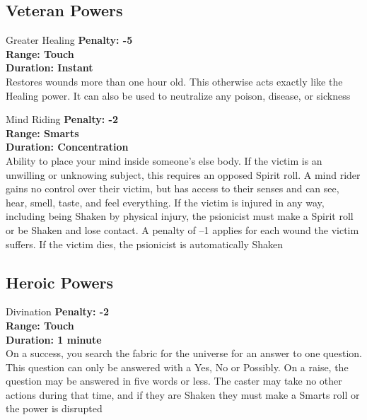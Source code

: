 \begin{multicols}{2}
\subsection{Veteran Powers}

\begin{genericsection}{Greater Healing}
\textbf{Penalty: -5}\\
\textbf{Range: Touch}\\
\textbf{Duration: Instant}\\
Restores wounds more than one hour old. This otherwise acts exactly like the Healing power. It can also be used to neutralize any poison, disease, or sickness
\end{genericsection}

\begin{genericsection}{Mind Riding}
\textbf{Penalty: -2}\\
\textbf{Range: Smarts}\\
\textbf{Duration: Concentration}\\
Ability to place your mind inside someone’s else body. If the victim is an unwilling or unknowing subject, this requires an opposed Spirit roll. A mind rider gains no control over their victim, but has access to their senses and can see, hear, smell, taste, and feel everything. If the victim is injured in any way, including being Shaken by physical injury, the psionicist must make a Spirit roll or be Shaken and lose contact. A penalty of –1 applies for each wound the victim suffers. If the victim dies, the psionicist is automatically Shaken
\end{genericsection}

\subsection{Heroic Powers}

\begin{genericsection}{Divination}
\textbf{Penalty: -2}\\
\textbf{Range: Touch}\\
\textbf{Duration: 1 minute}\\
On a success, you search the fabric for the universe for an answer to one question. This question can only be answered with a Yes, No or Possibly. On a raise, the question may be answered in five words or less. The caster may take no other actions during that time, and if they are Shaken they must make a Smarts roll or the power is disrupted
\end{genericsection}

\end{multicols}
